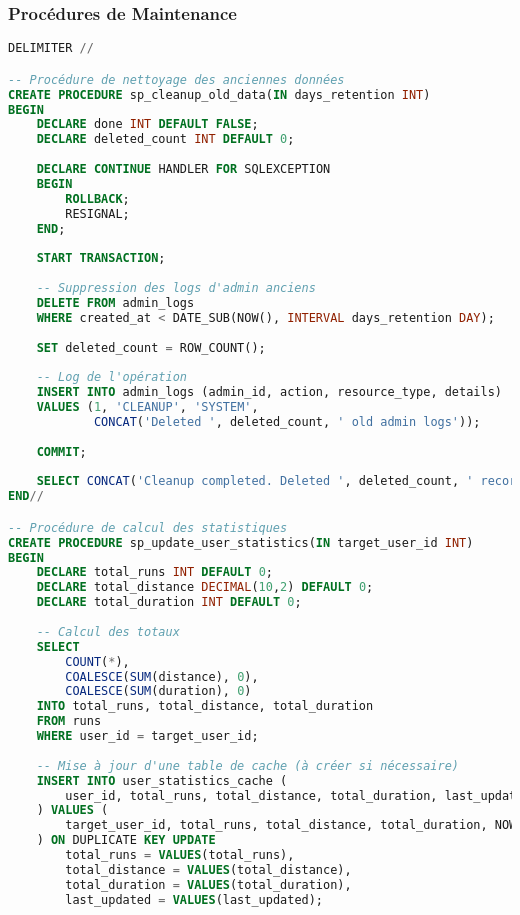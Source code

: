 \subsubsection{Procédures de Maintenance}

\begin{lstlisting}[language=sql]
DELIMITER //

-- Procédure de nettoyage des anciennes données
CREATE PROCEDURE sp_cleanup_old_data(IN days_retention INT)
BEGIN
    DECLARE done INT DEFAULT FALSE;
    DECLARE deleted_count INT DEFAULT 0;
    
    DECLARE CONTINUE HANDLER FOR SQLEXCEPTION
    BEGIN
        ROLLBACK;
        RESIGNAL;
    END;
    
    START TRANSACTION;
    
    -- Suppression des logs d'admin anciens
    DELETE FROM admin_logs 
    WHERE created_at < DATE_SUB(NOW(), INTERVAL days_retention DAY);
    
    SET deleted_count = ROW_COUNT();
    
    -- Log de l'opération
    INSERT INTO admin_logs (admin_id, action, resource_type, details)
    VALUES (1, 'CLEANUP', 'SYSTEM', 
            CONCAT('Deleted ', deleted_count, ' old admin logs'));
    
    COMMIT;
    
    SELECT CONCAT('Cleanup completed. Deleted ', deleted_count, ' records.') as result;
END//

-- Procédure de calcul des statistiques
CREATE PROCEDURE sp_update_user_statistics(IN target_user_id INT)
BEGIN
    DECLARE total_runs INT DEFAULT 0;
    DECLARE total_distance DECIMAL(10,2) DEFAULT 0;
    DECLARE total_duration INT DEFAULT 0;
    
    -- Calcul des totaux
    SELECT 
        COUNT(*),
        COALESCE(SUM(distance), 0),
        COALESCE(SUM(duration), 0)
    INTO total_runs, total_distance, total_duration
    FROM runs 
    WHERE user_id = target_user_id;
    
    -- Mise à jour d'une table de cache (à créer si nécessaire)
    INSERT INTO user_statistics_cache (
        user_id, total_runs, total_distance, total_duration, last_updated
    ) VALUES (
        target_user_id, total_runs, total_distance, total_duration, NOW()
    ) ON DUPLICATE KEY UPDATE
        total_runs = VALUES(total_runs),
        total_distance = VALUES(total_distance),
        total_duration = VALUES(total_duration),
        last_updated = VALUES(last_updated);
        

\end{lstlisting}
